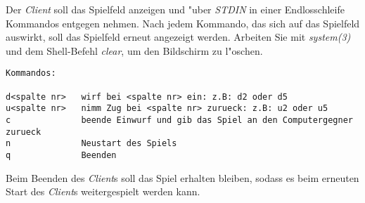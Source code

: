 Der \emph{Client} soll das Spielfeld anzeigen und "uber \emph{STDIN} in einer Endlosschleife Kommandos entgegen nehmen. Nach jedem Kommando, das sich auf das Spielfeld auswirkt, soll das Spielfeld erneut angezeigt werden. Arbeiten Sie mit \emph{system(3)} und dem Shell-Befehl \emph{clear}, um den Bildschirm zu l"oschen.
\begin{verbatim}
Kommandos:

d<spalte nr>   wirf bei <spalte nr> ein: z.B: d2 oder d5
u<spalte nr>   nimm Zug bei <spalte nr> zurueck: z.B: u2 oder u5
c              beende Einwurf und gib das Spiel an den Computergegner zurueck
n              Neustart des Spiels
q              Beenden
\end{verbatim}

Beim Beenden des \emph{Client}s soll das Spiel erhalten bleiben, sodass es beim erneuten Start des \emph{Client}s weitergespielt werden kann.

\osueguidelinesthree


